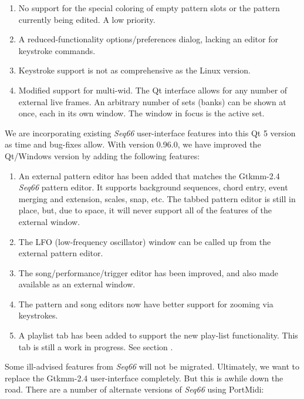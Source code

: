    \begin{enumerate}
      \item No support for the special coloring of empty pattern slots
         or the pattern currently being edited. A low priority.
      \item A reduced-functionality options/preferences dialog, lacking an
         editor for keystroke commands.
      \item Keystroke support is not as comprehensive as the Linux version.
      \item Modified support for multi-wid.  The Qt interface allows
         for any number of external live frames.
         An arbitrary number of sets (banks) can be shown at once,
         each in its own window.  The window in focus is the active set.
   \end{enumerate}

   We are incorporating existing \textsl{Seq66} user-interface
   features into this Qt 5 version as time and bug-fixes allow.
   With version 0.96.0, we have improved the Qt/Windows version by adding the
   following features:

   \begin{enumerate}
      \item An external pattern editor has been added that matches
         the Gtkmm-2.4 \textsl{Seq66} pattern editor.  It supports
         background sequences, chord entry, event merging and extension,
         scales, snap, etc.  The tabbed pattern editor is still in place, but,
         due to space, it will never support all of the features of the
         external window.
      \item The LFO (low-frequency oscillator) window can be
         called up from the external pattern editor.
      \item The song/performance/trigger editor has been improved, and also
         made available as an external window.
      \item The pattern and song editors now have better support for zooming
         via keystrokes.
      \item A playlist tab has been added to support the new play-list
         functionality.  This tab is still a work in progress.
         See section .
   \end{enumerate}

   Some ill-advised features from \textsl{Seq66} will not be migrated.
   Ultimately, we want to replace the Gtkmm-2.4 user-interface completely.
   But this is awhile down the road.
   There are a number of alternate versions of \textsl{Seq66} using
   PortMidi:

